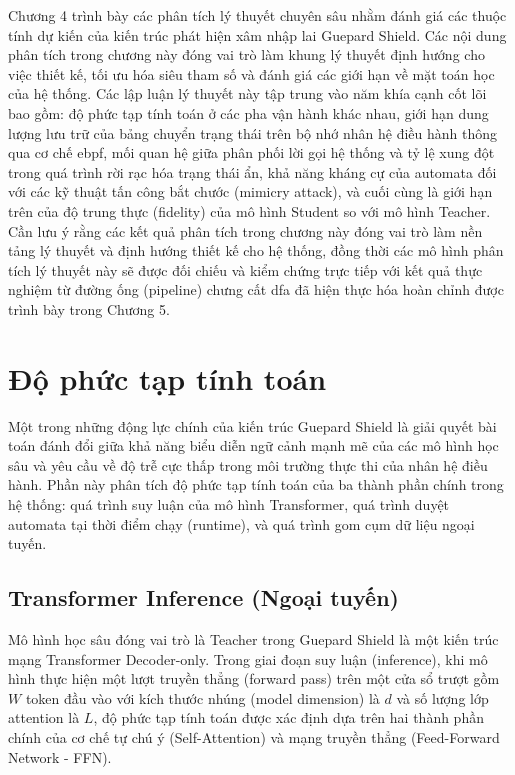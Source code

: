\documentclass[../main.tex]{subfiles}
\begin{document}
Chương 4 trình bày các phân tích lý thuyết chuyên sâu nhằm đánh giá
các thuộc tính dự kiến của kiến trúc phát hiện xâm nhập lai Guepard
Shield. Các nội dung phân tích trong chương này đóng vai trò làm
khung lý thuyết định hướng cho việc thiết kế, tối ưu hóa siêu tham số
và đánh giá các giới hạn về mặt toán học của hệ thống. Các lập luận
lý thuyết này tập trung vào năm khía cạnh cốt lõi bao gồm: độ phức
tạp tính toán ở các pha vận hành khác nhau, giới hạn dung lượng lưu
trữ của bảng chuyển trạng thái trên bộ nhớ nhân hệ điều hành thông
qua cơ chế \gls{ebpf}, mối quan hệ giữa phân phối lời gọi hệ thống và tỷ lệ
xung đột trong quá trình rời rạc hóa trạng thái ẩn, khả năng kháng cự
của automata đối với các kỹ thuật tấn công bắt chước (mimicry
attack), và cuối cùng là giới hạn trên của độ trung thực (fidelity)
của mô hình Student so với mô hình Teacher. Cần lưu ý rằng các kết
quả phân tích trong chương này đóng vai trò làm nền tảng lý thuyết và
định hướng thiết kế cho hệ thống, đồng thời các mô hình phân tích lý
thuyết này sẽ được đối chiếu và kiểm chứng trực tiếp với kết quả thực
nghiệm từ đường ống (pipeline) chưng cất \gls{dfa} đã hiện thực hóa hoàn
chỉnh được trình bày trong Chương 5.

\section{Độ phức tạp tính toán}
\label{sec:computational_complexity}

Một trong những động lực chính của kiến trúc Guepard Shield là giải
quyết bài toán đánh đổi giữa khả năng biểu diễn ngữ cảnh mạnh mẽ của
các mô hình học sâu và yêu cầu về độ trễ cực thấp trong môi trường
thực thi của nhân hệ điều hành. Phần này phân tích độ phức tạp tính
toán của ba thành phần chính trong hệ thống: quá trình suy luận của
mô hình Transformer, quá trình duyệt automata tại thời điểm chạy
(runtime), và quá trình gom cụm dữ liệu ngoại tuyến.

\subsection{Transformer Inference (Ngoại tuyến)}
\label{subsec:transformer_inference_complexity}

Mô hình học sâu đóng vai trò là Teacher trong Guepard Shield là một
kiến trúc mạng Transformer Decoder-only. Trong giai đoạn suy luận
(inference), khi mô hình thực hiện một lượt truyền thẳng (forward
pass) trên một cửa sổ trượt gồm $W$ token đầu vào với kích thước
nhúng (model dimension) là $d$ và số lượng lớp attention là $L$, độ
phức tạp tính toán được xác định dựa trên hai thành phần chính của cơ
chế tự chú ý (Self-Attention) và mạng truyền thẳng (Feed-Forward Network - FFN).
\end{document}
